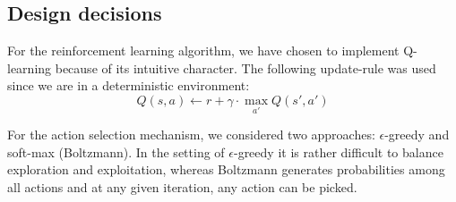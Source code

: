 \documentclass[10pt,a4paper,twocolumn]{article}
\begin{document}
\subsection{Design decisions}
For the reinforcement learning algorithm, we have chosen to implement Q-learning because of its intuitive character. The following update-rule was used since we are in a deterministic environment:
$$Q(s,a) \gets r + \gamma\cdot \max\limits_{a'}Q(s',a')$$

For the action selection mechanism, we considered two approaches: $\epsilon$-greedy and soft-max (Boltzmann). In the setting of $\epsilon$-greedy it is rather difficult to balance exploration and exploitation, whereas Boltzmann generates probabilities among all actions and at any given iteration, any action can be picked.
\end{document}
